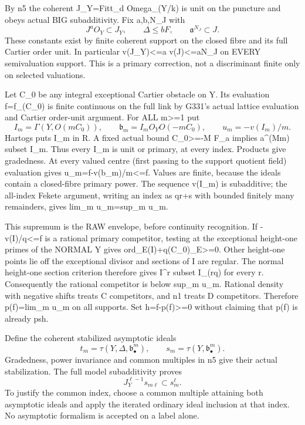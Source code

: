 \documentclass[11pt]{article}
\begin{document}
By n5 the coherent J\_Y=Fitt\_d Omega\_(Y/k) is unit on the puncture and obeys actual BIG subadditivity. Fix a,b,N\_J with
\[
J^a O_Y\subset J_Y,\qquad \Delta\le bF,
\qquad \mathfrak a^{N_J}\subset J.
\]
These constants exist by finite coherent support on the closed fibre and its full Cartier order unit. In particular v(J\_Y)<=a v(J)<=aN\_J on EVERY semivaluation support. This is a primary correction, not a discriminant finite only on selected valuations.

Let C\_0 be any integral exceptional Cartier obstacle on Y. Its evaluation f=f\_(C\_0) is finite continuous on the full link by G331's actual lattice evaluation and Cartier order-unit argument. For ALL m>=1 put
\[
I_m=\Gamma(Y,O(mC_0)),\qquad
\mathfrak b_m=I_m O_Y O(-mC_0),\qquad u_m=-v(I_m)/m.
\]
Hartogs puts I\_m in R. A fixed actual bound C\_0>=-M F\_a implies a\textasciicircum{}(Mm) subset I\_m. Thus every I\_m is unit or primary, at every index. Products give gradedness. At every valued centre (first passing to the support quotient field) evaluation gives u\_m=f-v(b\_m)/m<=f. Values are finite, because the ideals contain a closed-fibre primary power. The sequence v(I\_m) is subadditive; the all-index Fekete argument, writing an index as qr+s with bounded finitely many remainders, gives lim\_m u\_m=sup\_m u\_m.

This supremum is the RAW envelope, before continuity recognition. If -v(I)/q<=f is a rational primary competitor, testing at the exceptional height-one primes of the NORMAL Y gives ord\_E(I)+q(C\_0)\_E>=0. Other height-one points lie off the exceptional divisor and sections of I are regular. The normal height-one section criterion therefore gives I\textasciicircum{}r subset I\_(rq) for every r. Consequently the rational competitor is below sup\_m u\_m. Rational density with negative shifts treats C competitors, and n1 treats D competitors. Therefore p(f)=lim\_m u\_m on all supports. Set h=f-p(f)>=0 without claiming that p(f) is already psh.

Define the coherent stabilized asymptotic ideals
\[
t_m=\tau(Y,\Delta,\mathfrak b_\bullet^m),\qquad
s_m=\tau(Y,\mathfrak b_\bullet^m).
\]
Gradedness, power invariance and common multiples in n5 give their actual stabilization. The full model subadditivity proves
\[
J_Y^{\ell-1}s_{m\ell}\subset s_m^\ell.
\]
To justify the common index, choose a common multiple attaining both asymptotic ideals and apply the iterated ordinary ideal inclusion at that index. No asymptotic formalism is accepted on a label alone.
\end{document}
